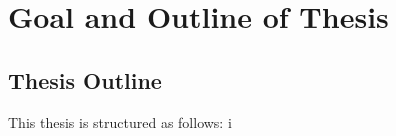 \section{Goal and Outline of Thesis}


\subsection{Thesis Outline}
This thesis is structured as follows: i